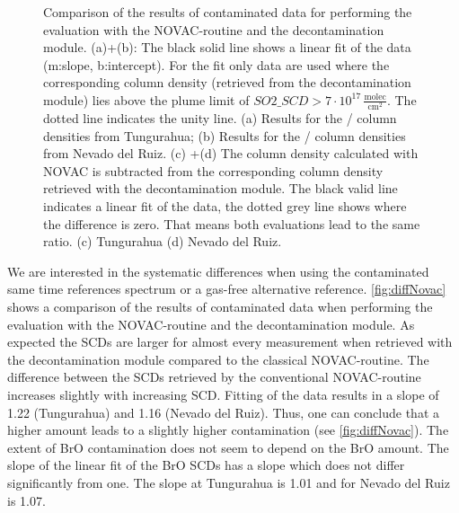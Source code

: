\documentclass  [
  paper    = a4,
  BCOR     = 10mm,
  twoside,
  fontsize = 12pt,
  fleqn,
  toc      = bibnumbered,
  toc      = listofnumbered,
  numbers  = noendperiod,
  headings = normal,
  listof   = leveldown,
  version  = 3.03
]                                       {scrreprt}
\begin{document}
\begin{figure}[h!]
{		\label{fig:diffratiod}}
	\caption[Comparison of the results of contaminated data for performing the evaluation with the NOVAC-routine and the decontamination module. The results for the ratio of BrO/ are shown.]{Comparison of the results of contaminated data for performing the evaluation with the NOVAC-routine and the decontamination module.  (a)+(b): The black solid line shows a linear fit of the data (m:slope, b:intercept). For the fit only data are used where the corresponding   column density (retrieved from the decontamination module) lies above the plume limit of $SO2\_SCD>7\cdot 10^{17}\,\frac{\text{molec}}{\text{cm}^2}$. The dotted line indicates the unity line. (a) Results for the   /  column densities from Tungurahua; (b) Results for the   /  column densities from Nevado del Ruiz. 
		(c) +(d) The column density calculated with NOVAC is subtracted from the corresponding column density retrieved with the decontamination module. The black valid line indicates a linear fit of the data, the dotted grey line shows where the difference is zero. That means both evaluations lead to the same ratio. (c) Tungurahua (d) Nevado del Ruiz. }
	\label{fig:diffratio}
\end{figure}
We are interested in the systematic differences when using the contaminated same time references spectrum or a gas-free alternative reference.  
\cref{fig:diffNovac} shows a comparison of the results of contaminated data when performing the evaluation with the NOVAC-routine and the decontamination module. 
As expected the  SCDs are larger for almost every measurement when retrieved with the decontamination module compared to the classical NOVAC-routine. The difference between the  SCDs retrieved by the conventional NOVAC-routine increases slightly with increasing  SCD. Fitting of the data results in a slope of 1.22 (Tungurahua) and 1.16 (Nevado del Ruiz). Thus, one can conclude that  a higher  amount leads to a slightly higher contamination (see \cref{fig:diffNovac}). The extent of BrO contamination does not seem to depend on the BrO amount. The slope of the linear fit of the BrO SCDs has a slope which does not differ significantly from one. The slope at Tungurahua is 1.01 and for Nevado del Ruiz is 1.07. \\
\end{document}
